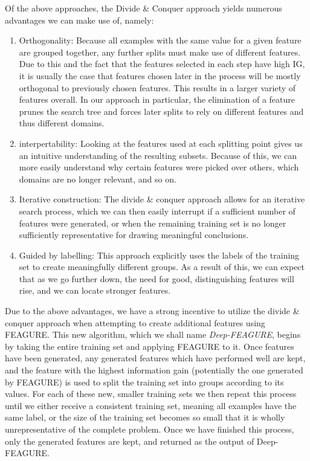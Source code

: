 \documentclass[twoside,11pt]{article}
\theoremstyle{definition}
\begin{document}
Of the above approaches, the Divide \& Conquer approach yields numerous advantages we can make use of, namely:
\begin{enumerate}
	\item Orthogonality: Because all examples with the same value for a given feature are grouped together, any further splits must make use of different features. Due to this and the fact that the features selected in each step have high IG, it is usually the case that features chosen later in the process will be mostly orthogonal to previously chosen features. This results in a larger variety of features overall. In our approach in particular, the elimination of a feature prunes the search tree and forces later splits to rely on different features and thus different domains.
	\item interpertability: Looking at the features used at each splitting point gives us an intuitive understanding of the resulting subsets. Because of this, we can more easily understand why certain features were picked over others, which domains are no longer relevant, and so on.
	\item Iterative construction: The divide \& conquer approach allows for an iterative search process, which we can then easily interrupt if a sufficient number of features were generated, or when the remaining training set is no longer sufficiently representative for drawing meaningful conclusions.
	\item Guided by labelling: This approach explicitly uses the labels of the training set to create meaningfully different groups. As a result of this, we can expect that as we go further down, the need for good, distinguishing features will rise, and we can locate stronger features.
\end{enumerate}

Due to the above advantages, we have a strong incentive to utilize the divide \& conquer approach when attempting to create additional features using FEAGURE. This new algorithm, which we shall name \emph{Deep-FEAGURE}, begins by taking the entire training set and applying FEAGURE to it. Once features have been generated, any generated features which have performed well are kept, and the feature with the highest information gain (potentially the one generated by FEAGURE) is used to split the training set into groups according to its values.
For each of these new, smaller training sets we then repeat this process until we either receive a consistent training set, meaning all examples have the same label, or the size of the training set becomes so small that it is wholly unrepresentative of the complete problem.
Once we have finished this process, only the generated features are kept, and returned as the output of Deep-FEAGURE.
\end{document}
